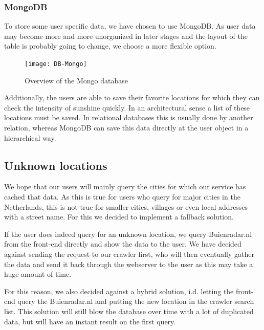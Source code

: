 \documentclass[a4paper]{article}
\newcommand\myworries[1]{\textcolor{red}{#1}}
\begin{document}
\subsubsection{MongoDB}
To store some user specific data, we have chosen to use MongoDB. As user data may become more and more unorganized in later stages and the layout of the table is probably going to change, we choose a more flexible option.

\begin{figure}[ht]
	\centering
	\texttt{[image: DB-Mongo]}
	\caption{Overview of the Mongo database}
	\label{fig:db:mongo}
\end{figure}

Additionally, the users are able to save their favorite locations for which they can check the intensity of sunshine quickly. In an architectural sense a list of these locations must be saved. In relational databases this is usually done by another relation, whereas MongoDB can save this data directly at the user object in a hierarchical way.

\subsection{Unknown locations}
We hope that our users will mainly query the cities for which our service has cached that data. As this is true for users who query for major cities in the Netherlands, this is not true for smaller cities, villages or even local addresses with a street name. For this we decided to implement a fallback solution.

If the user does indeed query for an unknown location, we query Buienradar.nl from the front-end directly and show the data to the user. We have decided against sending the request to our crawler first, who will then eventually gather the data and send it back through the webserver to the user as this may take a huge amount of time.


For this reason, we also decided against a hybrid solution, i.d. letting the front-end query the Buienradar.nl and putting the new location in the crawler search list. This solution will still blow the database over time with a lot of duplicated data, but will have an instant result on the first query. 
\end{document}
